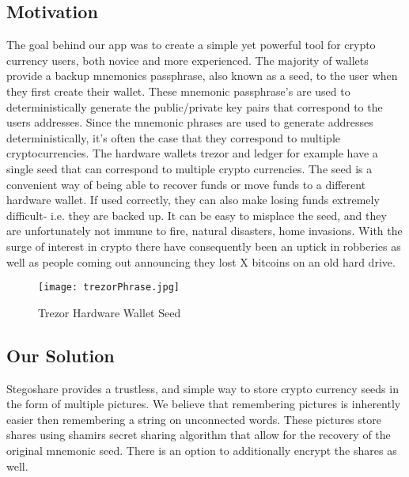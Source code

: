 \subsection{Motivation}
The goal behind our app was to create a simple yet powerful tool for crypto currency users, both novice and more experienced. The majority of wallets provide a backup
mnemonics passphrase, also known as a seed, to the user when they first create their wallet. These mnemonic passphrase's are used to deterministically generate the public/private key
pairs that correspond to the users addresses. Since the mnemonic phrases are used to generate addresses deterministically, it's often the case that they correspond to multiple
cryptocurrencies. The hardware wallets trezor and ledger for example have a single seed that can correspond to multiple crypto currencies. The seed is a convenient way of being able
to recover funds or move funds to a different hardware wallet. If used correctly, they can also make losing funds extremely difficult- i.e. they are backed up. It can be easy to misplace the seed, and
they are unfortunately not immune to fire, natural disasters, home invasions. With the surge of interest in crypto there have consequently been an uptick in robberies as well as people
coming out announcing they lost X bitcoins on an old hard drive.

\begin{figure}[H]
	\centering
  \texttt{[image: trezorPhrase.jpg]}
	\caption{Trezor Hardware Wallet Seed}
	\label{fig: Trezor Wallet}
\end{figure}

\subsection{Our Solution}
Stegoshare provides a trustless, and simple way to store crypto currency seeds in the form of multiple pictures. We believe that remembering pictures is inherently easier then remembering
a string on unconnected words. These pictures store shares using shamirs secret sharing algorithm that allow for the recovery of the original mnemonic seed. There is an option to additionally encrypt
the shares as well.

